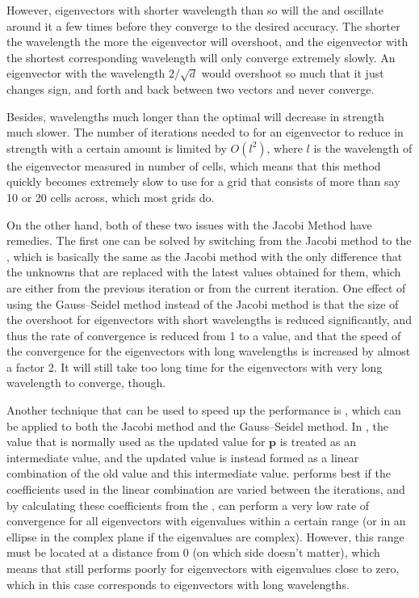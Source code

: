 However, eigenvectors with shorter wavelength than so will \overshoot the  and oscillate around it a few times before they converge to the desired accuracy. The shorter the wavelength the more the eigenvector will overshoot, and the eigenvector with the shortest corresponding wavelength will only converge extremely slowly. An eigenvector with the wavelength $2/\sqrt{d}$ would overshoot so much that it just changes sign, and \oscillate forth and back between two vectors and never converge.

Besides, wavelengths much longer than the optimal will decrease in strength much slower. The number of iterations needed to for an eigenvector to reduce in strength with a certain amount is limited by $O(l^2)$, where $l$ is the wavelength of the eigenvector measured in number of cells, which means that this method quickly becomes extremely slow to use for a grid that consists of more than say 10 or 20 cells across, which most grids do.

On the other hand, both of these two issues with the Jacobi Method have remedies. The first one can be solved by switching from the Jacobi method to the , which is basically the same as the Jacobi method with the only difference that the unknowns that are replaced with the latest values obtained for them, which are either from the previous iteration or from the current iteration. One effect of using the Gauss--Seidel method instead of the Jacobi method is that the size of the overshoot for eigenvectors with short wavelengths is reduced significantly, and thus the rate of convergence is reduced from 1 to a value, and that the speed of the convergence for the eigenvectors with long wavelengths is increased by almost a factor 2. It will still take too long time for the eigenvectors with very long wavelength to converge, though.

Another technique that can be used to speed up the performance is \SOR, which can be applied to both the Jacobi method and the Gauss--Seidel method. In \SOR, the value that is normally used as the updated value for $\mathbf{p}$ is treated as an intermediate value, and the updated value is instead formed as a linear combination of the old value and this intermediate value. \SOR performs best if the coefficients used in the linear combination are varied between the iterations, and by calculating these coefficients from the , \SOR can perform a very low rate of convergence for all eigenvectors with eigenvalues within a certain range (or in an ellipse in the complex plane if the eigenvalues are complex). However, this range must be located at a distance from 0 (on which side doesn't matter), which means that \SOR still performs poorly for eigenvectors with eigenvalues close to zero, which in this case corresponds to eigenvectors with long wavelengths.

